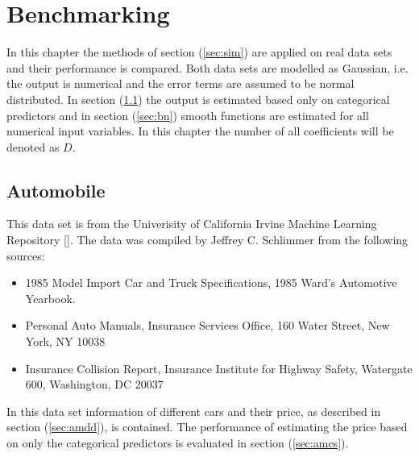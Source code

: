 \documentclass[12pt,letterpaper]{article}
\numberwithin{equation}{subsection}
\begin{document}
\section{Benchmarking}
\label{sec:benchmark}
In this chapter the methods of section (\ref{sec:sim}) are applied on real data sets and their performance is compared. Both data sets are modelled as Gaussian, i.e. the output is numerical and the error terms are assumed to be normal distributed. In section (\ref{sec:am}) the output is estimated based only on categorical predictors and in section (\ref{sec:bn}) smooth functions are estimated for all numerical input variables. In this chapter the number of all coefficients will be denoted as $D$.
\subsection{Automobile}
\label{sec:am}
This data set is from the Univerisity of California Irvine Machine Learning Repository [\cite{uci}]. The data was compiled by Jeffrey C. Schlimmer from the following sources:
\begin{itemize}
\item 1985 Model Import Car and Truck Specifications, 1985 Ward's Automotive Yearbook.
\item Personal Auto Manuals, Insurance Services Office, 160 Water Street, New York, NY 10038
\item Insurance Collision Report, Insurance Institute for Highway Safety, Watergate 600, Washington, DC 20037
\end{itemize}
In this data set information of different cars and their price, as described in section (\ref{sec:amdd}), is contained. The performance of estimating the price based on only the categorical predictors is evaluated in section (\ref{sec:amcs}).
\end{document}
